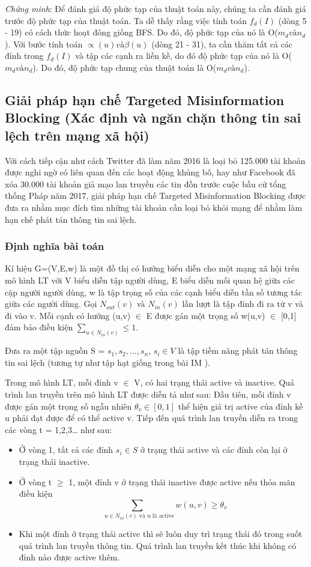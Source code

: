 		{\itshape Chứng minh}: Để đánh giá độ phức tạp của thuật toán này, chúng ta cần đánh giá trước độ phức tạp của thuật toán. Ta dễ thấy rằng việc tính  toán $f_{d}(I)$ (dòng 5 - 19) có cách thức hoạt đông giống BFS. Do đó, độ phức tạp của nó là O($m_{d} và n_{d}$). Với bước tính toán $\propto(u) và \beta(u)$ (dòng 21 - 31), ta cần thăm tất cả các đỉnh trong $f_{d}(I)$ và tập các cạnh ra liền kề, do đó độ phức tạp của nó là O($m_{d} và n_{d}$). Do đó, độ phức tạp chung của thuật toán là O($m_{d} và n_{d}$). 
	\subsection{Giải pháp hạn chế Targeted Misinformation Blocking (Xác định và ngăn chặn thông tin sai lệch trên mạng xã hội)}
Với cách tiếp cận như cách Twitter đã làm năm 2016 là loại bỏ 125.000 tài khoản được nghi ngờ có liên quan đến các hoạt động khủng bố, hay như Facebook đã xóa 30.000 tài khoản giả mạo lan truyền các tin đồn trước cuộc bầu cử tổng thống Pháp năm 2017, giải pháp hạn chế Targeted Misinformation Blocking được đưa ra nhằm mục đích tìm những tài khoản cần loại bỏ khỏi mạng để nhằm làm hạn chế phát tán thông tin sai lệch.

\subsubsection{Định nghĩa bài toán}
Kí hiệu G=(V,E,w) là một đồ thị có hướng biểu diễn cho một mạng xã hội trên mô hình LT với V biểu diễn tập người dùng, E biểu diễn mối quan hệ giữa các cặp người người dùng, w là tập trọng số của các cạnh biểu diễn tần số tương tác giữa các người dùng. Gọi $N_{out}(v)$ và $N_{in}(v)$ lần lượt là tập đỉnh đi ra từ v và đi vào v. Mỗi cạnh có hướng (u,v) $\in$ E được gán một trọng số w(u,v) $\in$ [0,1] đảm bảo điều kiện $\sum_{u \in N_{in}(v)} \leq 1$.

Đưa ra một tập nguồn S = {$s_{1}, s_{2}, ... , s_{n}$}, $s_{i} \in V$ là tập tiềm năng phát tán thông tin sai lệch (tương tự như tập hạt giống trong bài IM \cite{kempe21}).

Trong mô hình LT, mỗi đỉnh v $\in$ V, có hai trạng thái active và inactive. Quá trình lan truyền trên mô hình LT được diễn tả như sau: Đầu tiên, mỗi đỉnh v được gán một trọng số ngẫu nhiên $\theta_{v} \in [0,1]$ thể hiện giá trị active của đỉnh kề u phải đạt được để có thể active v. Tiếp đến quá trình lan truyền diễn ra trong các vòng t = 1,2,3… như sau: 		
\begin {itemize}
\item Ở vòng 1, tất cả các đỉnh $s_{i} \in S$ ở trạng thái active và các đỉnh còn lại ở trạng thái inactive.

\item Ở vòng t $\ge$ 1, một đỉnh v ở trạng thái inactive được active nếu thỏa mãn điều kiện $$\sum_{\mbox{ $u \in N_{in}(v) $ và  u  là active}} w(u, v)\geq \theta_v$$

\item Khi một đỉnh ở trạng thái active thì sẽ luôn duy trì trạng thái đó trong suốt quá trình lan truyền thông tin. Quá trình lan truyền kết thúc khi không có đỉnh nào được active thêm.	
\end {itemize}


